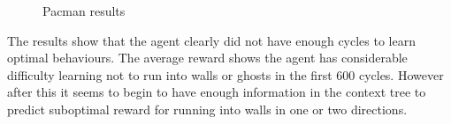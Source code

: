 \documentclass[pdftex,twoside,a4paper]{report}
\begin{document}
\begin{figure}[h]
  \begin{center}
  \end{center}
  \caption{Pacman results}
  \label{fig:pacman_results}
\end{figure}

The results show that the agent clearly did not have enough cycles to learn optimal behaviours. The average reward shows the agent has considerable difficulty learning not to run into walls or ghosts in the first 600 cycles. However after this it seems to begin to have enough information in the context tree to predict suboptimal reward for running into walls in one or two directions.



\end{document}

